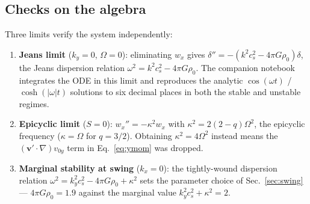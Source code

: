 \documentclass[11pt]{article}
\begin{document}
\subsection{Checks on the algebra}
\label{app:checks}
Three limits verify the system independently:
\begin{enumerate}
  \item \textbf{Jeans limit} ($k_y=0$, $\Omega=0$): eliminating $w_x$ gives
        $\delta'' = -(k^2c_s^2 - 4\pi G\rho_0)\delta$, the Jeans dispersion relation
        $\omega^2 = k^2c_s^2-4\pi G\rho_0$. The companion notebook integrates the ODE in
        this limit and reproduces the analytic $\cos(\omega t)$ / $\cosh(|\omega|t)$
        solutions to six decimal places in both the stable and unstable regimes.
  \item \textbf{Epicyclic limit} ($S=0$): $w_x'' = -\kappa^2w_x$ with
        $\kappa^2 = 2(2-q)\Omega^2$, the epicyclic frequency ($\kappa=\Omega$ for
        $q=3/2$). Obtaining $\kappa^2 = 4\Omega^2$ instead means the
        $(\mathbf{v}'\cdot\nabla)v_{0y}$ term in Eq.~\eqref{eq:ymom} was dropped.
  \item \textbf{Marginal stability at swing} ($k_x=0$): the tightly-wound dispersion
        relation $\omega^2 = k_y^2c_s^2 - 4\pi G\rho_0 + \kappa^2$ sets the parameter
        choice of Sec.~\ref{sec:swing} --- $4\pi G\rho_0 = 1.9$ against the marginal
        value $k_y^2c_s^2+\kappa^2 = 2$.
\end{enumerate}
\end{document}
